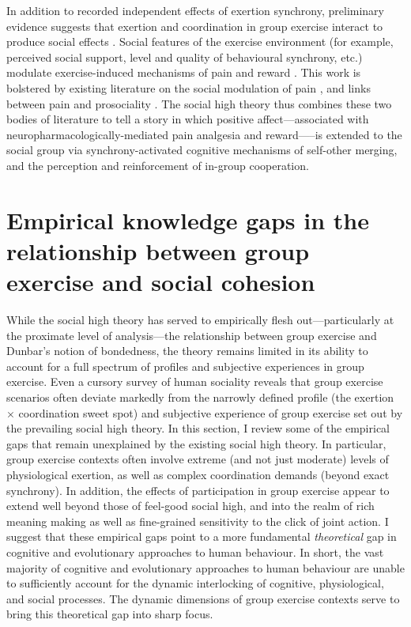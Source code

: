 \begin{CJK}{UTF8}{gbsn}
In addition to recorded independent effects of exertion synchrony,  preliminary evidence suggests that exertion and coordination in group exercise interact to produce social effects \citep{Jackson2018}.  Social features of the exercise environment (for example, perceived social support, level and quality of behavioural synchrony, etc.) modulate exercise-induced mechanisms of pain and reward \citep{Cohen2009,Sullivan2014,Tarr2015,Davis2015,Weinstein2016}. This work is bolstered by existing literature on the social modulation of pain \citep{Eisenberger2012a}, and links between pain and prosociality \citep{Bastian2014a}.  The social high theory thus combines these two bodies of literature to tell a story in which positive affect---associated with neuropharmacologically-mediated pain analgesia and reward—--is extended to the social group via synchrony-activated cognitive mechanisms of self-other merging, and the perception and reinforcement of in-group cooperation.


\section{Empirical knowledge gaps in the relationship between group exercise and social cohesion\label{sect:empKnowGaps}}
While the social high theory has served to empirically flesh out---particularly at the proximate level of analysis---the relationship between group exercise and Dunbar's notion of bondedness, the theory remains limited in its ability to account for a full spectrum of profiles and subjective experiences in group exercise.
Even a cursory survey of human sociality reveals that group exercise scenarios often deviate markedly from the narrowly defined profile (the exertion $\times$ coordination sweet spot) and subjective experience of group exercise set out by the prevailing social high theory.  In this section, I review some of the empirical gaps that remain unexplained by the existing social high theory.  In particular, group exercise contexts often involve extreme (and not just moderate) levels of physiological exertion, as well as complex coordination demands (beyond exact synchrony).  In addition, the effects of participation in group exercise appear to extend well beyond those of feel-good social high, and into the realm of rich meaning making as well as fine-grained sensitivity to the click of joint action.  I suggest that these empirical gaps point to a more fundamental \textit{theoretical} gap in cognitive and evolutionary approaches to human behaviour. In short, the vast majority of cognitive and evolutionary approaches to human behaviour are unable to sufficiently account for the dynamic interlocking of cognitive, physiological, and social processes.  The dynamic dimensions of group exercise contexts serve to bring this theoretical gap into sharp focus.


\end{CJK}
